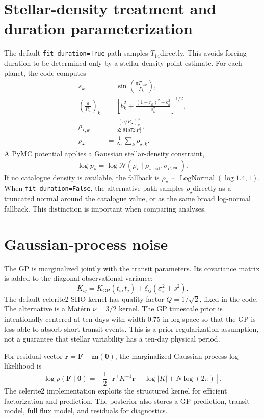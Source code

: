 \documentclass[12pt,a4paper,oneside]{report}
\newcommand{\Rstar}{\ensuremath{R_{\star}}}
\newcommand{\rhoStar}{\ensuremath{\rho_{\star}}}
\newcommand{\Porb}{\ensuremath{P}}
\newcommand{\Tfourteen}{\ensuremath{T_{14}}}
\newcommand{\code}[1]{\texttt{\small #1}}
\begin{document}
\section{Stellar-density treatment and duration parameterization}
The default \code{fit\_duration=True} path samples \Tfourteen directly. This
avoids forcing duration to be determined only by a stellar-density point
estimate. For each planet, the code computes
\begin{align}
  s_k &= \sin\left(\frac{\pi\Tfourteen{}_{k}}{\Porb{}_{k}}\right),\\
  \left(\frac{a}{\Rstar}\right)_k
    &=\left[b_k^2+\frac{(1+r_k)^2-b_k^2}{s_k^2}\right]^{1/2},\\
  \rho_{\star,k} &=\frac{(a/\Rstar)_k^3}{52.91572\,\Porb{}_{k}^2},\\
  \rhoStar &= \frac{1}{N_{\mathrm{p}}}\sum_k\rho_{\star,k}.
\end{align}
A PyMC potential applies a Gaussian stellar-density constraint,
\begin{equation}
  \log p_{\rho}=\log\mathcal{N}(\rhoStar\mid
  \rho_{\star,\mathrm{cat}},\sigma_{\rho,\mathrm{cat}}).
\end{equation}
If no catalogue density is available, the fallback is
\(\rhoStar\sim\operatorname{LogNormal}(\log1.4,1)\). When
\code{fit\_duration=False}, the alternative path samples \rhoStar directly as a
truncated normal around the catalogue value, or as the same broad log-normal
fallback. This distinction is important when comparing analyses.

\section{Gaussian-process noise}
The GP is marginalized jointly with the transit parameters. Its covariance
matrix is added to the diagonal observational variance:
\begin{equation}
  K_{ij}=K_{\mathrm{GP}}(t_i,t_j)+
  \delta_{ij}\left(\sigma_i^2+s^2\right).
\end{equation}
The default celerite2 SHO kernel has quality factor
\(Q=1/\sqrt{2}\), fixed in the code. The alternative is a Matérn
\(\nu=3/2\) kernel. The GP timescale prior is intentionally centered at ten
days with width 0.75 in log space so that the GP is less able to absorb short
transit events. This is a prior regularization assumption, not a guarantee that
stellar variability has a ten-day physical period.

For residual vector \(\boldsymbol{r}=\boldsymbol{F}-\boldsymbol{m}
(\boldsymbol{\theta})\), the marginalized Gaussian-process log likelihood is
\begin{equation}
  \log p(\boldsymbol{F}\mid\boldsymbol{\theta})
  =-\frac{1}{2}\left[\boldsymbol{r}^{\mathsf T}K^{-1}\boldsymbol{r}
  +\log|K|+N\log(2\pi)\right].
\end{equation}
The celerite2 implementation exploits the structured kernel for efficient
factorization and prediction. The posterior also stores a GP prediction,
transit model, full flux model, and residuals for diagnostics.
\end{document}
